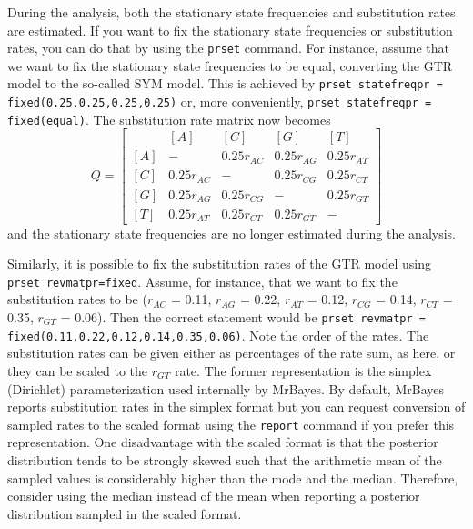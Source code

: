 \documentclass[12pt]{book}
\begin{document}
During the analysis, both the stationary state frequencies and substitution rates are estimated. If
you want to fix the stationary state frequencies or substitution rates, you can do that by using
the \texttt{prset} command. For instance, assume that we want to fix the stationary state
frequencies to be equal, converting the GTR model to the so-called SYM model. This is achieved by
\texttt{prset statefreqpr = fixed(0.25,0.25,0.25,0.25)} or, more conveniently, \texttt{prset
statefreqpr = fixed(equal)}. The substitution rate matrix now becomes
\[ Q=\begin{bmatrix}
    & [A] & [C] & [G] & [T]\\
 [A]& - & 0.25 r_{AC} & 0.25 r_{AG} & 0.25 r_{AT}\\
 [C]& 0.25 r_{AC} & - & 0.25 r_{CG} &0.25 r_{CT}\\
 [G]& 0.25 r_{AG} & 0.25 r_{CG}& - & 0.25 r_{GT}\\
 [T]& 0.25 r_{AT} & 0.25 r_{CT}&0.25 r_{GT} & -
\end{bmatrix}
\]
and the stationary state frequencies are no longer estimated during the analysis.

Similarly, it is possible to fix the substitution rates of the GTR model using \texttt{prset
revmatpr=fixed}. Assume, for instance, that we want to fix the substitution rates to be ($r_{AC}$ =
0.11, $r_{AG}$ = 0.22, $r_{AT}$ = 0.12, $r_{CG}$ = 0.14, $r_{CT}$ = 0.35, $r_{GT}$ = 0.06). Then
the correct statement would be \texttt{prset revmatpr = fixed(0.11,0.22,0.12,0.14,0.35,0.06)}. Note
the order of the rates. The substitution rates can be given either as percentages of the rate sum,
as here, or they can be scaled to the $r_{GT}$ rate. The former representation is the simplex
(Dirichlet) parameterization used internally by MrBayes. By default, MrBayes reports substitution
rates in the simplex format but you can request conversion of sampled rates to the scaled format
using the \texttt{report} command if you prefer this representation. One disadvantage with the
scaled format is that the posterior distribution tends to be strongly skewed such that the
arithmetic mean of the sampled values is considerably higher than the mode and the median.
Therefore, consider using the median instead of the mean when reporting a posterior distribution
sampled in the scaled format.
\end{document}
